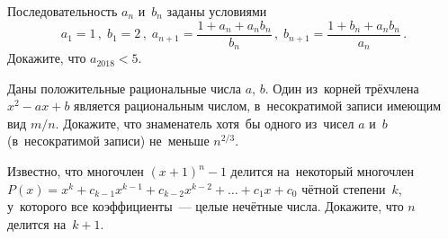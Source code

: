 


\begin{problems}

\item
Последовательность $a_{n}$ и~$b_{n}$ заданы условиями
\[
    a_{1} = 1
\, , \;
    b_{1} = 2
\, , \;
    a_{n+1} = \frac{1 + a_{n} + a_{n} b_{n}}{b_{n}}
\, , \;
    b_{n+1} = \frac{1 + b_{n} + a_{n} b_{n}}{a_{n}}
\, . \]
Докажите, что $a_{2018} < 5$.

\item
Даны положительные рациональные числа $a$, $b$.
Один из~корней трёхчлена $x^2 - a x + b$ является рациональным числом,
в~несократимой записи имеющим вид $m / n$.
Докажите, что знаменатель хотя~бы одного из~чисел $a$ и~$b$ (в~несократимой
записи) не~меньше $n^{2/3}$.

\item
Известно, что многочлен $(x + 1)^n - 1$ делится на~некоторый многочлен
\(
    P(x) = x^k + c_{k-1} x^{k-1} + c_{k-2} x^{k-2} + \ldots + c_{1}x + c_{0}
\)
чётной степени~$k$, у~которого все коэффициенты~--- целые нечётные числа.
Докажите, что $n$ делится на~$k + 1$.

\end{problems}

